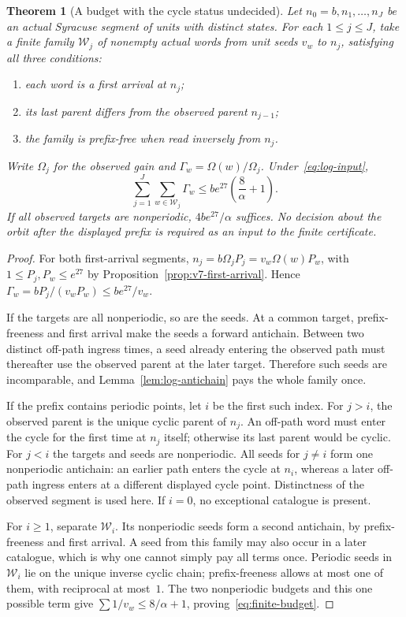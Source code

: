\documentclass[11pt,a4paper]{article}
\newtheorem{theorem}{Theorem}[section]
\theoremstyle{definition}
\begin{document}
\begin{theorem}[A budget with the cycle status undecided]
\label{thm:finite-offpath}
Let $n_0=b,n_1,\ldots,n_J$ be an actual Syracuse segment of units
with distinct states. For each $1\le j\le J$, take a finite family
$\mathcal W_j$ of nonempty actual words from unit seeds $v_w$ to
$n_j$, satisfying all three conditions:
\begin{enumerate}[label=(\roman*),leftmargin=*]
\item each word is a first arrival at $n_j$;
\item its last parent differs from the observed parent $n_{j-1}$;
\item the family is prefix-free when read inversely from $n_j$.
\end{enumerate}
Write $\Omega_j$ for the observed gain and
$\Gamma_w=\Omega(w)/\Omega_j$. Under~\eqref{eq:log-input},
\begin{equation}\label{eq:finite-budget}
 \sum_{j=1}^J\sum_{w\in\mathcal W_j}\Gamma_w
 \le b e^{27}\left(\frac8\alpha+1\right).
\end{equation}
If all observed targets are nonperiodic, $4be^{27}/\alpha$ suffices.
No decision about the orbit after the displayed prefix is required
as an input to the finite certificate.
\end{theorem}
\begin{proof}
For both first-arrival segments,
$n_j=b\Omega_jP_j=v_w\Omega(w)P_w$, with
$1\le P_j,P_w\le e^{27}$ by
Proposition~\ref{prop:v7-first-arrival}. Hence
$\Gamma_w=bP_j/(v_wP_w)\le be^{27}/v_w$.

If the targets are all nonperiodic, so are the seeds. At a common
target, prefix-freeness and first arrival make the seeds a forward
antichain. Between two distinct off-path ingress times, a seed
already entering the observed path must thereafter use the observed
parent at the later target. Therefore such seeds are incomparable,
and Lemma~\ref{lem:log-antichain} pays the whole family once.

If the prefix contains periodic points, let $i$ be the first such
index. For $j>i$, the observed parent is the unique cyclic parent
of $n_j$. An off-path word must enter the cycle for the first time
at $n_j$ itself; otherwise its last parent would be cyclic. For
$j<i$ the targets and seeds are nonperiodic. All seeds for
$j\ne i$ form one nonperiodic antichain: an earlier path enters
the cycle at $n_i$, whereas a later off-path ingress enters at a
different displayed cycle point. Distinctness of the observed
segment is used here. If $i=0$, no exceptional catalogue is present.

For $i\ge1$, separate $\mathcal W_i$. Its nonperiodic seeds form
a second antichain, by prefix-freeness and first arrival. A seed
from this family may also occur in a later catalogue, which is why
one cannot simply pay all terms once. Periodic seeds in
$\mathcal W_i$ lie on the unique inverse cyclic chain; prefix-freeness
allows at most one of them, with reciprocal at most~$1$.
The two nonperiodic budgets and this one possible term give
$\sum 1/v_w\le8/\alpha+1$, proving~\eqref{eq:finite-budget}.
\end{proof}
\end{document}
